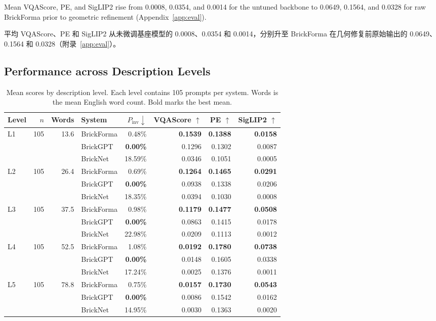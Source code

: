 \documentclass[11pt,letterpaper]{article}
\newcommand{\zh}[1]{{\chinesefont #1}}
\newcommand{\pair}[2]{\par\addvspace{4pt}\noindent
  \begin{minipage}{\linewidth}\raggedright
  #1\par\nobreak\vspace{1pt}
  {\color{translation}\chinesefont\fontsize{10.5}{15.3}\selectfont #2\par}
  \end{minipage}\par}
\begin{document}
\pair{Mean VQAScore, PE, and SigLIP2 rise from 0.0008, 0.0354, and 0.0014 for the untuned backbone to 0.0649, 0.1564, and 0.0328 for raw BrickForma prior to geometric refinement (Appendix~\ref{app:eval}).}{平均 VQAScore、PE 和 SigLIP2 从未微调基座模型的 0.0008、0.0354 和 0.0014，分别升至 BrickForma 在几何修复前原始输出的 0.0649、0.1564 和 0.0328（附录~\ref{app:eval}）。}

\subsection{Performance across Description Levels\enspace\zh{各描述级别的表现}}

\begin{table}[!htbp]
\centering\small
\setlength{\tabcolsep}{3pt}
\begin{tabular}{lrrlrrrr}
\toprule
Level & $n$ & Words & System & $P_{\mathrm{inv}}\downarrow$ & VQAScore $\uparrow$ & PE $\uparrow$ & SigLIP2 $\uparrow$ \\
\midrule
L1 & 105 & 13.6 & BrickForma & 0.48\% & \textbf{0.1539} & \textbf{0.1388} & \textbf{0.0158} \\
&  &  & BrickGPT & \textbf{0.00\%} & 0.1296 & 0.1302 & 0.0087 \\
&  &  & BrickNet & 18.59\% & 0.0346 & 0.1051 & 0.0005 \\
\midrule
L2 & 105 & 26.4 & BrickForma & 0.69\% & \textbf{0.1264} & \textbf{0.1465} & \textbf{0.0291} \\
&  &  & BrickGPT & \textbf{0.00\%} & 0.0938 & 0.1338 & 0.0206 \\
&  &  & BrickNet & 18.35\% & 0.0394 & 0.1030 & 0.0008 \\
\midrule
L3 & 105 & 37.5 & BrickForma & 0.98\% & \textbf{0.1179} & \textbf{0.1477} & \textbf{0.0508} \\
&  &  & BrickGPT & \textbf{0.00\%} & 0.0863 & 0.1415 & 0.0178 \\
&  &  & BrickNet & 22.98\% & 0.0209 & 0.1113 & 0.0012 \\
\midrule
L4 & 105 & 52.5 & BrickForma & 1.08\% & \textbf{0.0192} & \textbf{0.1780} & \textbf{0.0738} \\
&  &  & BrickGPT & \textbf{0.00\%} & 0.0148 & 0.1605 & 0.0338 \\
&  &  & BrickNet & 17.24\% & 0.0025 & 0.1376 & 0.0011 \\
\midrule
L5 & 105 & 78.8 & BrickForma & 0.75\% & \textbf{0.0157} & \textbf{0.1730} & \textbf{0.0543} \\
&  &  & BrickGPT & \textbf{0.00\%} & 0.0086 & 0.1542 & 0.0162 \\
&  &  & BrickNet & 14.95\% & 0.0030 & 0.1363 & 0.0020 \\
\bottomrule
\end{tabular}
\caption{Mean scores by description level. Each level contains 105 prompts per system. Words is the mean English word count. Bold marks the best mean.}
\label{tab:level-results}
\end{table}
\end{document}
